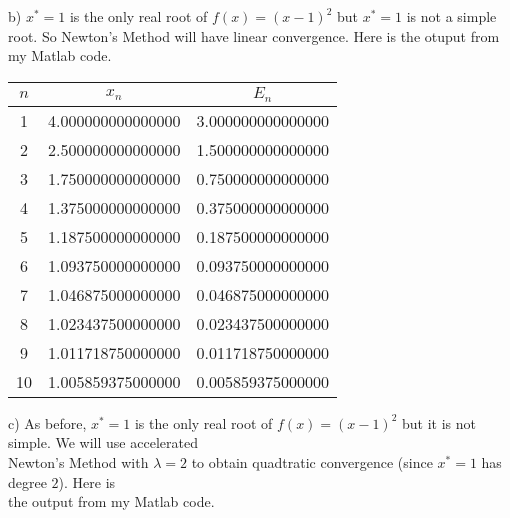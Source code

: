 \documentclass[11pt]{article}
\begin{document}
\begin{exercise}{4}
{\begin{center}
\begin{tabular}{|c|c|c|}
            \end{tabular}
        \end{center}
        \hspace{1.35em} b) $x^* = 1$ is the only real root of $f(x) = (x - 1)^2$ but $x^* = 1$ is not a simple root.
        So Newton's Method \indent \hspace{1em} will have linear convergence.
        Here is the otuput from my Matlab code.
        \begin{center}
            \begin{tabular}{|c|c|c|}
                \hline
                $n$ & $x_n$             &  $E_n$             \\ \hline
                1   & 4.000000000000000 &  3.000000000000000 \\ \hline
                2   & 2.500000000000000 &  1.500000000000000 \\ \hline
                3   & 1.750000000000000 &  0.750000000000000 \\ \hline
                4   & 1.375000000000000 &  0.375000000000000 \\ \hline
                5   & 1.187500000000000 &  0.187500000000000 \\ \hline
                6   & 1.093750000000000 &  0.093750000000000 \\ \hline
                7   & 1.046875000000000 &  0.046875000000000 \\ \hline
                8   & 1.023437500000000 &  0.023437500000000 \\ \hline
                9   & 1.011718750000000 &  0.011718750000000 \\ \hline
               10   & 1.005859375000000 &  0.005859375000000 \\ \hline
            \end{tabular}
        \end{center}
        \newpage
        c) As before, $x^* = 1$ is the only real root of $f(x) = (x - 1)^2$ but it is not simple.
        We will use accelerated \\
        \indent \hspace{1em} Newton's Method with $\lambda = 2$ to obtain quadtratic convergence (since $x^* = 1$ has degree $2$).
        Here is \\
        \indent \hspace{1em} the output from my Matlab code.
        \begin{center}
            \begin{tabular}{|c|c|c|}

\end{tabular}
\end{center}}
\end{exercise}
\end{document}

